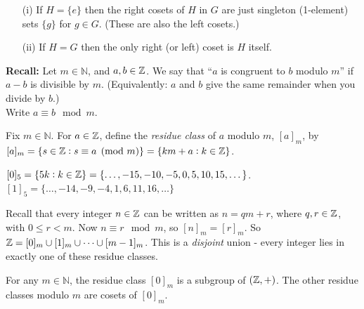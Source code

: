 \begin{remarks}\begin{enumerate}
\item[(i)] If $H = \{e\}$ then the right cosets of $H$ in $G$ are just singleton (1-element)	 sets $\{g\}$ for $g \in G$. (These are also the left cosets.) 
\item[(ii)] If $H = G$ then the only right (or left) coset is $H$ itself.
\end{enumerate}
\end{remarks}\vspace*{10pt}




\textbf{Recall:}   
Let $m \in \mathbb{N}$, and $a,b \in \mathbb{Z}$. We say that ``$a$ is congruent to $b$ modulo $m$'' if $a-b$ is divisible by $m$. (Equivalently: $a$ and $b$ give the same remainder when you divide by $b$.)\\

Write $a \equiv b \mod m$.\\

\begin{definition} Fix $m \in \mathbb{N}$. For $a \in \mathbb{Z}$, define the \emph{residue class} of $a$ modulo $m$, $[a]_m$, by $[a]_m = \{s \in \mathbb{Z} : s \equiv a \pmod{m}\} = \{km + a : k \in \mathbb{Z}\}$.	
\end{definition}\vspace*{10pt}



\begin{examples} $[0]_5 = \{5k : k \in \mathbb{Z}\} = \{\dots, -15,-10,-5,0,5,10,15,\dots\}$.\\
$[1]_5 = \{\dots,-14,-9,-4,1,6,11,16,\dots\}$
\end{examples}

Recall that every integer $n \in \mathbb{Z}$ can be written as $n = qm + r$, where $q,r \in \mathbb{Z}$, with $0 \leq r < m$. Now $n \equiv r \mod m$, so $[n]_m = [r]_m$. So $\mathbb{Z} = [0]_m \cup [1]_m \cup \dots \cup [m-1]_m$. This is a \emph{disjoint} union - every integer lies in exactly one of these residue classes.\\

\begin{proposition} For any $m \in \mathbb{N}$, the residue class $[0]_m$ is a subgroup of $(\mathbb{Z},+)$. The other residue classes modulo $m$ are cosets of $[0]_m$. 	
\end{proposition}

